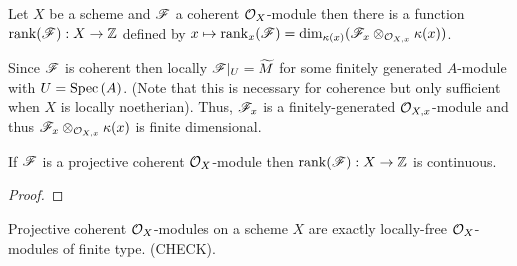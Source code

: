 \documentclass[12pt]{extarticle}
\newcommand{\rank}{\mathrm{rank}}
\begin{document}
\begin{definition}
Let $X$ be a scheme and $\mathscr{F}$ a coherent $\mathcal{O}_{X}$-module then there is a function $\rank(\F) : X \to \Z$ defined by $x \mapsto \rank_x(\F) = \dim_{\kappa(x)}(\F_x \otimes_{\stalk{X}{x}} \kappa(x))$. 
\end{definition}

\begin{remark}
Since $\mathscr{F}$ is coherent then locally $\mathscr{F} |_U = \widetilde{M}$ for some finitely generated $A$-module with $U = \mathrm{Spec}\left( A \right)$. (Note that this is necessary for coherence but only sufficient when $X$ is locally noetherian). Thus, $\mathscr{F}_x$ is a finitely-generated $\mathcal{O}_{X, x}$-module and thus $\mathscr{F}_x \otimes_{\mathcal{O}_{X, x}} \kappa(x)$ is finite dimensional. 
\end{remark}

\begin{theorem}
If $\mathscr{F}$ is a projective coherent $\mathcal{O}_{X}$-module then $\rank(\F) : X \to \Z$ is continuous. 
\end{theorem}

\begin{proof}

\end{proof}

\begin{proposition}
Projective coherent $\mathcal{O}_{X}$-modules on a scheme $X$ are exactly locally-free $\mathcal{O}_{X}$-modules of finite type. (CHECK).
\end{proposition}
\end{document}
